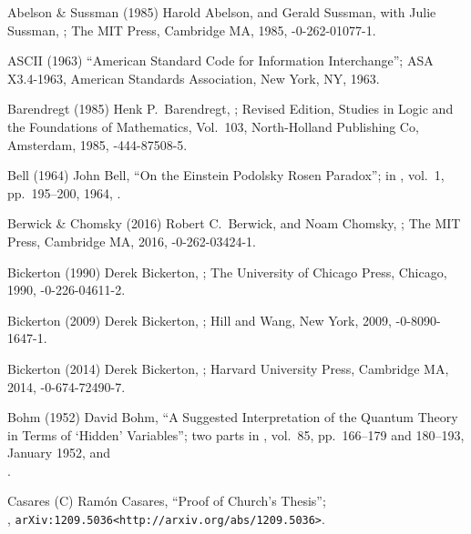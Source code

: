 

 Abelson \& Sussman (1985)
Harold Abelson, and Gerald Sussman, with Julie Sussman,
;
The MIT Press, Cambridge MA, 1985,
-0-262-01077-1.

 ASCII (1963)
``American Standard Code for Information Interchange'';
ASA X3.4-1963,
American Standards Association, New York, NY, 1963.

 Barendregt (1985)
Henk P.\ Barendregt,
;
Revised Edition, Studies in Logic and the Foundations of Mathematics,
Vol.\ 103, North-Holland Publishing Co, Amsterdam, 1985,
-444-87508-5.

 Bell (1964)
John Bell,
``On the Einstein Podolsky Rosen Paradox'';
in ,
vol.\ 1, pp.\ 195--200, 1964,
.

 Berwick \& Chomsky (2016)
Robert C.\ Berwick, and Noam Chomsky,
;
The MIT Press, Cambridge MA, 2016,
-0-262-03424-1.

 Bickerton (1990)
Derek Bickerton,
;
The University of Chicago Press, Chicago, 1990,
-0-226-04611-2.

 Bickerton (2009)
Derek Bickerton,
;
Hill and Wang, New York, 2009,
-0-8090-1647-1.

 Bickerton (2014)
Derek Bickerton,
;
Harvard University Press, Cambridge MA, 2014,
-0-674-72490-7.

 Bohm (1952)
David Bohm,
``A Suggested Interpretation of the Quantum Theory
in Terms of `Hidden' Variables''; two parts
in ,
vol.\ 85, pp.\ 166--179 and 180--193, January 1952,
 and\\
.

 Casares (C)
Ram\'on Casares,
``Proof of Church's Thesis'';\\
,
{\tt\URL arXiv:1209.5036<http://arxiv.org/abs/1209.5036>}.


